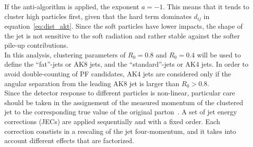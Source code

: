 If the anti-\kt algorithm is applied, the exponent $a = -1$. This means that it tends to cluster high \pt particles first, given that the hard term dominates $d_{ij}$ in equation~\ref{eq:dist_akt}. Since the soft particles have lower impacts, the shape of the jet is not sensitive to the soft radiation and rather stable against the softer pile-up contributions.\\
In this analysis, clustering parameters of $R_0 = 0.8$ and $R_0 = 0.4$ will be used to define the ``fat''-jets or AK8 jets, and the ``standard''-jets or AK4 jets. In order to avoid double-counting of PF candidates, AK4 jets are considered only if the angular separation from the leading AK8 jet is larger than $R_0>0.8$.\\
Since the detector response to different particles is non-linear, particular care should be taken in the assignement of the measured momentum of the clustered jet to the corresponding true value of the original parton~\cite{bib:1748-0221-6-11-P11002}. A set of jet energy corrections (JECs) are applied sequentially and with a fixed order. Each correction constists in a rescaling of the jet four-momentum, and it takes into account different effects that are factorized.
